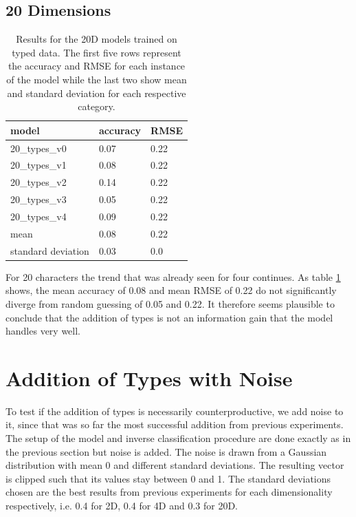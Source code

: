 \subsection{20 Dimensions}

\begin{table}[!htb]
	\centering
	\caption{Results for the 20D models trained on typed data. The first five rows represent the accuracy and RMSE for each instance of the model while the last two show mean and standard deviation for each respective category.}
	\begin{tabularx}{\textwidth}{ X  X  X }
		\hline
		model & accuracy & RMSE \\ 
		\hline
		20\_types\_v0 & 0.07 & 0.22 \\ 
		20\_types\_v1 & 0.08 & 0.22 \\
		20\_types\_v2 & 0.14 & 0.22 \\ 
		20\_types\_v3 & 0.05 & 0.22 \\ 
		20\_types\_v4 & 0.09 & 0.22 \\ \hline
		mean & 0.08 &  0.22\\
		standard deviation & 0.03 & 0.0\\
		\hline
	\end{tabularx}
	\label{table:20_types}
\end{table}

For 20 characters the trend that was already seen for four continues. As table \ref{table:20_types} shows, the mean accuracy of 0.08 and mean RMSE of 0.22 do not significantly diverge from random guessing of 0.05 and 0.22. It therefore seems plausible to conclude that the addition of types is not an information gain that the model handles very well. 

\section{Addition of Types with Noise}

To test if the addition of types is necessarily counterproductive, we add noise to it, since that was so far the most successful addition from previous experiments. \\
The setup of the model and inverse classification procedure are done exactly as in the previous section but noise is added. The noise is drawn from a Gaussian distribution with mean 0 and different standard deviations. The resulting vector is clipped such that its values stay between 0 and 1. The standard deviations chosen are the best results from previous experiments for each dimensionality respectively, i.e. 0.4 for 2D, 0.4 for 4D and 0.3 for 20D.

